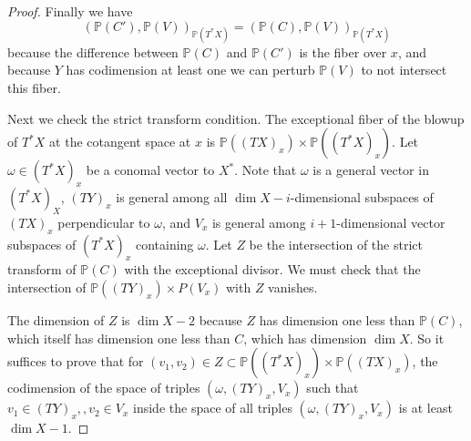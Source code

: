 \begin{proof}
Finally we have \[ (\mathbb P(C'), \mathbb P(V))_{\mathbb P(T^* X) } =(\mathbb P(C), \mathbb P(V))_{\mathbb P(T^* X) }\] because the difference between $\mathbb P(C)$ and $\mathbb P(C')$ is the fiber over $x$, and because $Y$ has codimension at least one we can perturb $\mathbb P(V)$ to not intersect this fiber.

Next we check the strict transform condition. The exceptional fiber of the blowup of $ T^* X$ at the cotangent space at $x$ is $\mathbb P ((TX)_x ) \times \mathbb P ( (T^* X)_x)$.  Let $\omega \in (T^*X)_x$ be a conomal vector to $X^*$. Note that $\omega$ is a general vector in $(T^*X)_X$, $(TY)_x$ is general among all $\dim X-i$-dimensional subspaces of $(TX)_x$ perpendicular to $\omega$, and $V_x$ is general among $i+1$-dimensional vector subspaces of $(T^*X)_x$ containing $\omega$. Let $Z$ be the intersection of the strict transform of $\mathbb P(C)$ with the exceptional divisor. We must check that the intersection of $ \mathbb P (  (TY)_x) \times P (V_x)$ with $Z$ vanishes.

The dimension of $Z$ is $\dim X-2$ because $Z$ has dimension one less than $\mathbb P(C)$, which itself has dimension one less than $C$, which has dimension $\dim X$.
So it suffices to prove that for $(v_1,v_2) \in Z \subset \mathbb P ( (T^*X)_x) \times \mathbb P( (TX)_x)$, the codimension of the space of triples $( \omega, (TY)_x, V_x)$ such that $v_1\in (TY)_x , ,v_2 \in V_x $ inside the space of all triples $(\omega, (TY)_x, V_x)$ is at least $\dim X-1$.





\end{proof}
